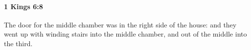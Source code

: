 
		\paragraph{1 Kings 6:8} %
			\label{1KINGS-6-8}

			The door for the middle chamber was in the right side of the house: and they went up with winding stairs into the middle chamber, and out of the middle into the third.


